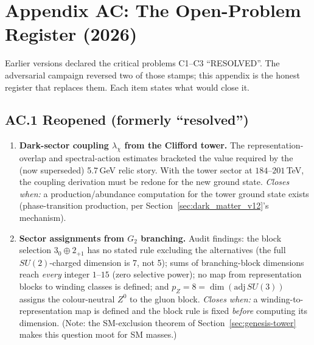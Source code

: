 \section{Appendix AC: The Open-Problem Register (2026)}
\label{app:AC}

Earlier versions declared the critical problems C1--C3 ``RESOLVED''. The adversarial campaign
reversed two of those stamps; this appendix is the honest register that replaces them. Each
item states what would close it.

\subsection*{AC.1 Reopened (formerly ``resolved'')}
\begin{enumerate}
\item \textbf{Dark-sector coupling $\lambda_\chi$ from the Clifford tower.} The
representation-overlap and spectral-action estimates bracketed the value required by the
(now superseded) 5.7\,GeV relic story. With the tower sector at $184$--$201$\,TeV, the
coupling derivation must be redone for the new ground state. \emph{Closes when:} a
production/abundance computation for the tower ground state exists (phase-transition
production, per Section~\ref{sec:dark_matter_v12}'s mechanism).
\item \textbf{Sector assignments from $G_2$ branching.} Audit findings: the block selection
$3_0\oplus2_{+1}$ has no stated rule excluding the alternatives (the full $SU(2)$-charged
dimension is 7, not 5); sums of branching-block dimensions reach \emph{every} integer
$1$--$15$ (zero selective power); no map from representation blocks to winding classes is
defined; and $p_Z=8=\dim(\mathrm{adj}\,SU(3))$ assigns the colour-neutral $Z^0$ to the gluon
block. \emph{Closes when:} a winding-to-representation map is defined and the block rule is
fixed \emph{before} computing its dimension. (Note: the SM-exclusion theorem of
Section~\ref{sec:genesis-tower} makes this question moot for SM masses.)
\end{enumerate}

